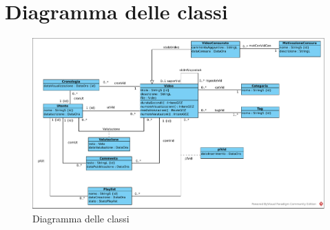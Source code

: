 \documentclass{article}
\begin{document}
\newpage

\section{\label{sec:DiagrammaDelleClassi}Diagramma delle classi}
\begin{figure}[h]
    \centering
    \includegraphics[width=1\textwidth]{../Diagrammi/diagramma delle classi.pdf}
    \caption{Diagramma delle classi}
\end{figure}

\newpage
\end{document}
